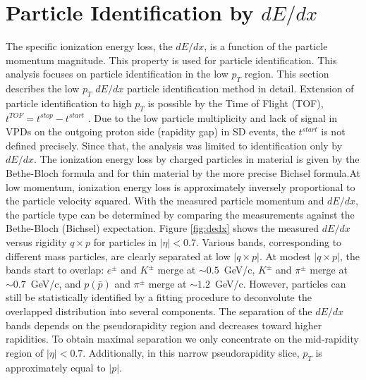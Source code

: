 \section{Particle Identification by $dE/dx$}\label{sec:pid}
The specific ionization energy loss, the $dE/dx$, is a function of the
particle momentum magnitude. This property is used
for particle identification. This analysis focuses on particle
identification in the low $p_T$ region. This section describes
the low $p_T$ $dE/dx$ particle identification method in detail.
Extension of particle identification to high $p_T$ is possible
by the Time of Flight (TOF), $t^{TOF}=t^{stop}-t^{start}$ . Due to the low particle multiplicity and lack of signal in VPDs on the outgoing proton side (rapidity gap) in SD events, the $t^{start}$ is not defined precisely. Since that, the analysis was limited to identification only by $dE/dx$. \newline
The ionization energy loss by charged particles in material
is given by the Bethe-Bloch formula and for
thin material by the more precise Bichsel formula\cite{Bichsel:2006cs}.At
low momentum, ionization energy loss is approximately
inversely proportional to the particle velocity squared.
With the measured particle momentum and $dE/dx$,
the particle type can be determined by comparing the
measurements against the Bethe-Bloch (Bichsel) expectation. Figure \ref{fig:dedx} shows the measured $dE/dx$ versus rigidity $q\times p$ for particles in $|\eta| < 0.7$. Various bands, corresponding
to different mass particles, are clearly separated
at low $|q\times p|$. At modest $|q\times p|$, the bands start to
overlap: $e^\pm$ and $K^\pm$ merge at $\sim0.5$~GeV/c, $K^\pm$ and
$\pi^\pm$ merge at $\sim0.7$~GeV/c, and $p(\bar{p})$ and $\pi^\pm$ merge
at $\sim1.2$~GeV/c. However, particles can still be statistically
identified by a fitting procedure to deconvolute the
overlapped distribution into several components. The
separation of the $dE/dx$ bands depends on the pseudorapidity
region and decreases toward higher rapidities.
To obtain maximal separation we only concentrate on
the mid-rapidity region of $|\eta| < 0.7$. Additionally, in this narrow pseudorapidity slice, $p_T$ is approximately equal to $|p|$.


